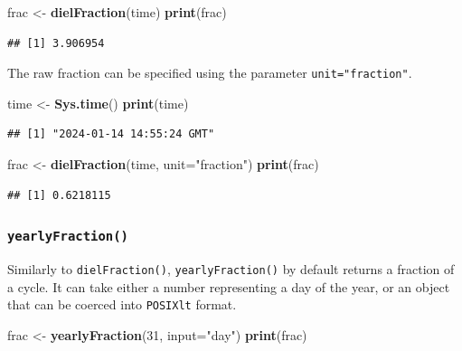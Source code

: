 \documentclass[
]{book}
\newenvironment{Shaded}{\begin{snugshade}}{\end{snugshade}}
\newcommand{\AttributeTok}[1]{\textcolor[rgb]{0.13,0.29,0.53}{#1}}
\newcommand{\DecValTok}[1]{\textcolor[rgb]{0.00,0.00,0.81}{#1}}
\newcommand{\FunctionTok}[1]{\textcolor[rgb]{0.13,0.29,0.53}{\textbf{#1}}}
\newcommand{\NormalTok}[1]{#1}
\newcommand{\OtherTok}[1]{\textcolor[rgb]{0.56,0.35,0.01}{#1}}
\newcommand{\StringTok}[1]{\textcolor[rgb]{0.31,0.60,0.02}{#1}}
\begin{document}
\begin{Shaded}
\begin{Highlighting}[]
\NormalTok{frac }\OtherTok{\textless{}{-}} \FunctionTok{dielFraction}\NormalTok{(time)}
\FunctionTok{print}\NormalTok{(frac)}
\end{Highlighting}
\end{Shaded}

\begin{verbatim}
## [1] 3.906954
\end{verbatim}

The raw fraction can be specified using the parameter \texttt{unit="fraction"}.

\begin{Shaded}
\begin{Highlighting}[]
\NormalTok{time }\OtherTok{\textless{}{-}} \FunctionTok{Sys.time}\NormalTok{()}
\FunctionTok{print}\NormalTok{(time)}
\end{Highlighting}
\end{Shaded}

\begin{verbatim}
## [1] "2024-01-14 14:55:24 GMT"
\end{verbatim}

\begin{Shaded}
\begin{Highlighting}[]
\NormalTok{frac }\OtherTok{\textless{}{-}} \FunctionTok{dielFraction}\NormalTok{(time, }\AttributeTok{unit=}\StringTok{"fraction"}\NormalTok{)}
\FunctionTok{print}\NormalTok{(frac)}
\end{Highlighting}
\end{Shaded}

\begin{verbatim}
## [1] 0.6218115
\end{verbatim}

\hypertarget{yearlyfraction}{%
\subsubsection{\texorpdfstring{\texttt{yearlyFraction()}}{yearlyFraction()}}\label{yearlyfraction}}

Similarly to \texttt{dielFraction()}, \texttt{yearlyFraction()} by default returns a fraction of a cycle. It can take either a number representing a day of the year, or an object that can be coerced into \texttt{POSIXlt} format.

\begin{Shaded}
\begin{Highlighting}[]
\NormalTok{frac }\OtherTok{\textless{}{-}} \FunctionTok{yearlyFraction}\NormalTok{(}\DecValTok{31}\NormalTok{, }\AttributeTok{input=}\StringTok{"day"}\NormalTok{)}
\FunctionTok{print}\NormalTok{(frac)}
\end{Highlighting}
\end{Shaded}
\end{document}
